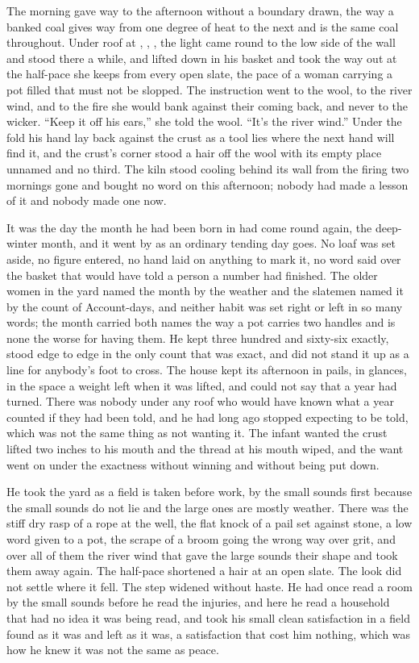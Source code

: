 The morning gave way to the afternoon without a boundary drawn, the way a banked coal gives way from one degree of heat to the next and is the same coal throughout. Under  roof at , , , the light came round to the low side of the wall and stood there a while, and  lifted  down in his basket and took the way out at the half-pace she keeps from every open slate, the pace of a woman carrying a pot filled that must not be slopped. The instruction went to the wool, to the river wind, and to the fire she would bank against their coming back, and never to the wicker. “Keep it off his ears,” she told the wool. “It's the river wind.” Under the fold his hand lay back against the crust as a tool lies where the next hand will find it, and the crust's corner stood a hair off the wool with its empty place unnamed and no third. The kiln stood cooling behind its wall from the firing two mornings gone and bought no word on this afternoon; nobody had made a lesson of it and nobody made one now.

It was the day the month he had been born in had come round again, the deep-winter month, and it went by as an ordinary tending day goes. No loaf was set aside, no figure entered, no hand laid on anything to mark it, no word said over the basket that would have told a person a number had finished. The older women in the yard named the month by the weather and the slatemen named it by the count of Account-days, and neither habit was set right or left in so many words; the month carried both names the way a pot carries two handles and is none the worse for having them. He kept three hundred and sixty-six exactly, stood edge to edge in the only count that was exact, and did not stand it up as a line for anybody's foot to cross. The house kept its afternoon in pails, in glances, in the space a weight left when it was lifted, and could not say that a year had turned. There was nobody under any roof who would have known what a year counted if they had been told, and he had long ago stopped expecting to be told, which was not the same thing as not wanting it. The infant wanted the crust lifted two inches to his mouth and the thread at his mouth wiped, and the want went on under the exactness without winning and without being put down.

He took the yard as a field is taken before work, by the small sounds first because the small sounds do not lie and the large ones are mostly weather. There was the stiff dry rasp of a rope at the well, the flat knock of a pail set against stone, a low word given to a pot, the scrape of a broom going the wrong way over grit, and over all of them the river wind that gave the large sounds their shape and took them away again. The half-pace shortened a hair at an open slate. The look did not settle where it fell. The step widened without haste. He had once read a room by the small sounds before he read the injuries, and here he read a household that had no idea it was being read, and took his small clean satisfaction in a field found as it was and left as it was, a satisfaction that cost him nothing, which was how he knew it was not the same as peace.

